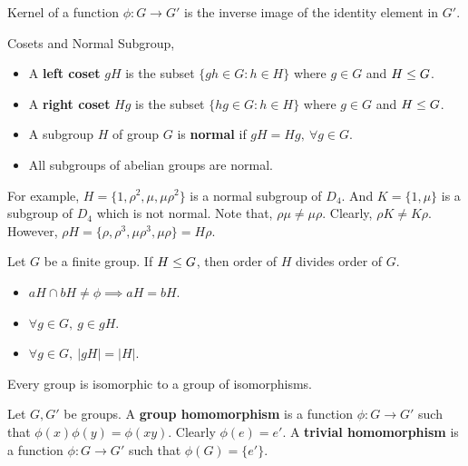 \begin{definition}
	Kernel of a function $\phi : G \to G'$ is the inverse image of the identity element in $G'$.%
\end{definition}

\begin{definition}Cosets and Normal Subgroup,
\begin{itemize}
	\item A \textbf{left coset} $gH$ is the subset $\{ gh \in G : h \in H \}$ where $g \in G$ and  $H \le G$.%
	\item A \textbf{right coset} $Hg$ is the subset $\{ hg \in G : h \in H \}$ where $g \in G$ and  $H \le G$.%
	\item A subgroup $H$ of group $G$ is \textbf{normal} if $gH = Hg,\ \forall g \in G$.
	\item All subgroups of abelian groups are normal.
\end{itemize}
\end{definition}

\begin{remark}
	For example, $H = \{1,\rho^2,\mu,\mu\rho^2\}$ is a normal subgroup of $D_4$.
	And $K = \{1,\mu\}$ is a subgroup of $D_4$ which is not normal.
	Note that, $\rho\mu \ne \mu\rho$.
	Clearly, $\rho K \ne K\rho$.
	However, $\rho H = \{ \rho, \rho^3, \mu\rho^3, \mu\rho \} = H\rho$.
\end{remark}

\begin{remark}%
	Let $G$ be a finite group.
	If $H \le G$, then order of $H$ divides order of $G$.
\end{remark}
\begin{itemize}
	\item $aH \cap bH \ne \phi \implies aH = bH$.
	\item $\forall g \in G,\ g \in gH$.
	\item $\forall g \in G,\ |gH| = |H|$.
\end{itemize}

\begin{remark}%
	Every group is isomorphic to a group of isomorphisms.
\end{remark}

\begin{definition}
	Let $G,G'$ be groups.
	A \textbf{group homomorphism} is a function $\phi : G \to G'$ such that $\phi(x)\phi(y) = \phi(xy)$.
	Clearly $\phi(e) = e'$.
	A \textbf{trivial homomorphism} is a function $\phi : G \to G'$ such that $\phi(G) = \{ e' \}$.
\end{definition}


